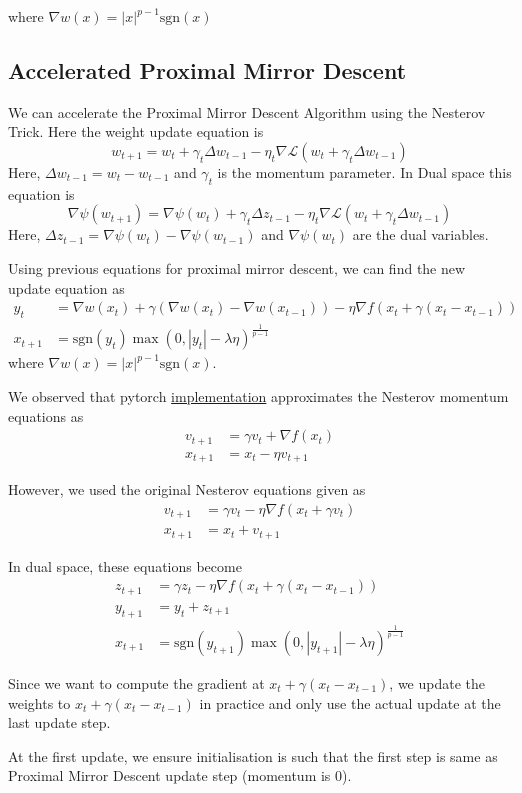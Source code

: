 where $\nabla w(x) = |x|^{p-1} \text{sgn}(x)$

\subsection*{Accelerated Proximal Mirror Descent}

We can accelerate the Proximal Mirror Descent Algorithm using the Nesterov Trick. Here the weight update equation is
\begin{equation}
w_{t+1} = w_t + \gamma_t \Delta w_{t-1} -\eta_t \nabla \mathcal{L}(w_t+\gamma_t\Delta w_{t-1})
\end{equation}
Here, $\Delta w_{t-1} = w_t-w_{t-1}$ and $\gamma_t$ is the momentum parameter. In Dual space this equation is 
\begin{equation}
\nabla \psi(w_{t+1}) = \nabla \psi(w_t) + \gamma_t\Delta z_{t-1} - \eta_t \nabla\mathcal{L}(w_t+\gamma_t \Delta w_{t-1})
\end{equation} 
Here, $\Delta z_{t-1} = \nabla \psi(w_t)-\nabla \psi(w_{t-1})$ and $\nabla \psi(w_t)$ are the dual variables.

Using previous equations for proximal mirror descent, we can find the new update equation as 
\begin{align*}
y_t &= \nabla w(x_t) + \gamma (\nabla w(x_t)-\nabla w(x_{t-1})) - \eta \nabla f(x_t+\gamma (x_t-x_{t-1}))\\
x_{t+1} &= \text{sgn}(y_t) \max(0, |y_t| - \lambda \eta)^{\frac{1}{p-1}}
\end{align*}
where $\nabla w(x) = |x|^{p-1} \text{sgn}(x)$.

We observed that pytorch \href{https://pytorch.org/docs/stable/generated/torch.optim.SGD.html}{implementation} approximates the Nesterov momentum equations as 
\begin{align*}
v_{t+1} &= \gamma v_t + \nabla f(x_t)\\
x_{t+1} &= x_t - \eta v_{t+1}
\end{align*}

However, we used the original Nesterov equations given as
\begin{align*}
v_{t+1} &= \gamma v_t - \eta \nabla f(x_t+\gamma v_t)\\
x_{t+1} &= x_t + v_{t+1}
\end{align*}

In dual space, these equations become
\begin{align*}
z_{t+1} &= \gamma z_t - \eta \nabla f(x_t+\gamma (x_t-x_{t-1}))\\
y_{t+1} &= y_t + z_{t+1}\\
x_{t+1} &= \text{sgn}(y_{t+1}) \max(0, |y_{t+1}| - \lambda \eta)^{\frac{1}{p-1}}
\end{align*}

Since we want to compute the gradient at $x_t+\gamma (x_t-x_{t-1})$, we update the weights to $x_t+\gamma (x_t-x_{t-1})$ in practice and only use the actual update at the last update step. 

At the first update, we ensure initialisation is such that the first step is same as Proximal Mirror Descent update step (momentum is 0).